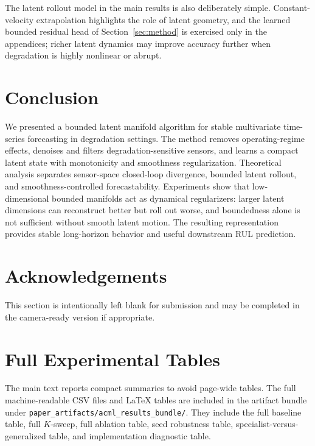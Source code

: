\documentclass[a4paper,fleqn]{cas-sc}
\begin{document}
The latent rollout model in the main results is also deliberately simple.
Constant-velocity extrapolation highlights the role of latent geometry, and the
learned bounded residual head of Section~\ref{sec:method} is exercised only in
the appendices; richer latent dynamics may improve accuracy further when
degradation is highly nonlinear or abrupt.

\section{Conclusion}

We presented a bounded latent manifold algorithm for stable multivariate
time-series forecasting in degradation settings. The method removes
operating-regime effects, denoises and filters degradation-sensitive sensors,
and learns a compact latent state with monotonicity and smoothness
regularization. Theoretical analysis separates sensor-space closed-loop
divergence, bounded latent rollout, and smoothness-controlled forecastability.
Experiments show that low-dimensional bounded manifolds act as dynamical
regularizers: larger latent dimensions can reconstruct better but roll out
worse, and boundedness alone is not sufficient without smooth latent motion.
The resulting representation provides stable long-horizon behavior and useful
downstream RUL prediction.

\section*{Acknowledgements}
This section is intentionally left blank for submission and may be completed in
the camera-ready version if appropriate.




\appendix

\section{Full Experimental Tables}

The main text reports compact summaries to avoid page-wide tables. The full
machine-readable CSV files and LaTeX tables are included in the artifact bundle
under \texttt{paper\_artifacts/acml\_results\_bundle/}. They include the full
baseline table, full $K$-sweep, full ablation table, seed robustness table,
specialist-versus-generalized table, and implementation diagnostic table.
\end{document}
